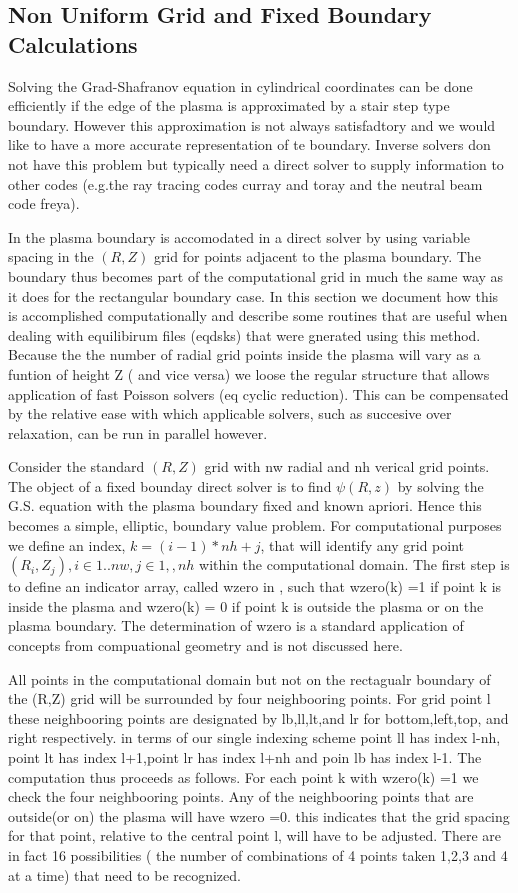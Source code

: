 \subsection{Non Uniform Grid and  Fixed Boundary Calculations}
 Solving the Grad-Shafranov equation in cylindrical coordinates can be
done efficiently if the edge of the plasma is approximated by a stair
step type boundary.
 However this approximation is not always satisfadtory and we would
like to 
have a more accurate representation of te boundary. Inverse solvers
don not have this problem but typically need a direct solver to supply
information to other codes 
(e.g.the ray tracing codes curray and toray and the neutral beam code
freya).

In \ot the plasma boundary is accomodated in a direct solver by using
variable spacing in the $(R,Z) $ grid for points adjacent to the
plasma boundary. The boundary thus becomes part of the computational
grid in much the same way as it does for the rectangular boundary
case. In this section we document how this is accomplished
computationally and describe some routines that are useful when
dealing with equilibirum files (eqdsks) that were gnerated using this
method. Because the the number of radial  grid points inside the plasma will
vary as a funtion of height Z ( and vice versa) we loose the  regular
structure that allows application of fast Poisson solvers (eq cyclic
reduction). This can be compensated by the relative ease with which 
applicable solvers, such as succesive over relaxation, can be run in
parallel however.  

Consider the standard $(R,Z)$ grid with nw radial and nh
verical grid points. The object of a fixed bounday direct solver is to find
$\psi(R,z) $ by solving the G.S. equation with the plasma boundary
fixed and known apriori. Hence this becomes a simple, elliptic,
boundary value problem. For computational purposes we define an index,
$k= (i-1)*nh + j $, that will identify any grid point $(R_i,Z_j), i \in 1..nw,
j \in 1,,nh $ within the computational domain. The first step is
to define an indicator array, called wzero in \ot, such that
wzero(k) =1 if point k is inside the plasma and wzero(k) = 0 if point
k is outside the plasma or on the plasma boundary. The determination 
of wzero is a standard
application of concepts from compuational geometry and is not
discussed here.

 All points in the computational domain but not on the
rectagualr boundary of the (R,Z) grid will be surrounded by four
neighbooring points. For grid point l these neighbooring points are
designated by lb,ll,lt,and lr for bottom,left,top, and right
respectively.  in terms of our single indexing scheme point ll has
index l-nh, point lt has index l+1,point lr has index l+nh and poin lb
has index l-1. The computation thus proceeds as follows. For each
point k with wzero(k) =1 we check the four neighbooring points. Any of
the neighbooring points that are outside(or on)  the plasma will have
wzero =0. this indicates that the grid spacing for that point,
relative to the central point l, will have to be adjusted. There are
in fact 16 possibilities ( the number of combinations of 4 points
taken  1,2,3 and 4 at a time) that need to be recognized. 

